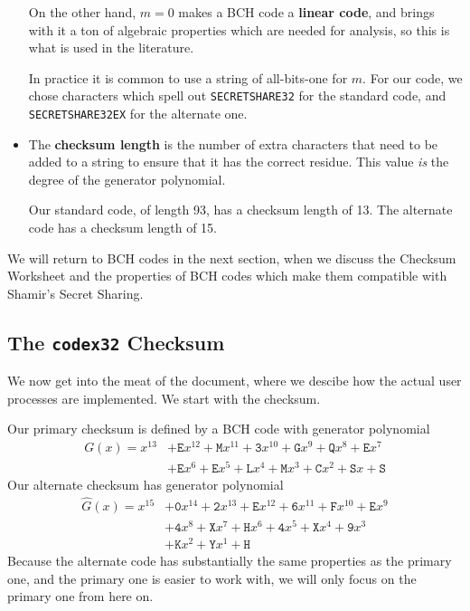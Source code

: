 \documentclass[letterpaper]{article}
\newcommand{\vc}[1]{\texttt{#1}} %
\begin{document}
\begin{itemize}
On the other hand, $m=0$ makes a BCH code a \textbf{linear code}, and brings
with it a ton of algebraic properties which are needed for analysis, so this
is what is used in the literature.

In practice it is common to use a string of all-bits-one for $m$. For our code,
we chose characters which spell out \vc{SECRETSHARE32} for the standard code,
and \vc{SECRETSHARE32EX} for the alternate one.

\item The \textbf{checksum length} is the number of extra characters that
need to be added to a string to ensure that it has the correct residue.
This value \emph{is} the degree of the generator polynomial.

Our standard code, of length 93, has a checksum length of 13. The alternate
code has a checksum length of 15.
\end{itemize}

We will return to BCH codes in the next section, when we discuss the Checksum
Worksheet and the properties of BCH codes which make them compatible with
Shamir's Secret Sharing.

\subsection{The \texttt{codex32} Checksum}

We now get into the meat of the document, where we descibe how the actual
user processes are implemented. We start with the checksum.

Our primary checksum is defined by a BCH code with generator polynomial
\begin{align*}
    G(x) = x^{13}
      &+ \vc{E}x^{12} + \vc{M}x^{11} + \vc{3}x^{10} + \vc{G}x^9 + \vc{Q}x^8 + \vc{E}x^7 \\
      &+ \vc{E}x^6 + \vc{E}x^5 + \vc{L}x^4 + \vc{M}x^3 + \vc{C}x^2 + \vc{S}x + \vc{S}
\end{align*}
Our alternate checksum has generator polynomial
\begin{align*}
    \hat{G}(x) = x^{15}
        &+ \vc{0}x^{14} + \vc{2}x^{13} + \vc{E}x^{12} + \vc{6}x^{11} + \vc{F}x^{10} + \vc{E}x^9 \\
        &+ \vc{4}x^8 + \vc{X}x^7 + \vc{H}x^6 + \vc{4}x^5 + \vc{X}x^4 + \vc{9}x^3 \\
        &+ \vc{K}x^2 + \vc{Y}x^1 + \vc{H}
\end{align*}
Because the alternate code has substantially the same properties as the primary
one, and the primary one is easier to work with, we will only focus on the
primary one from here on.
\end{document}
